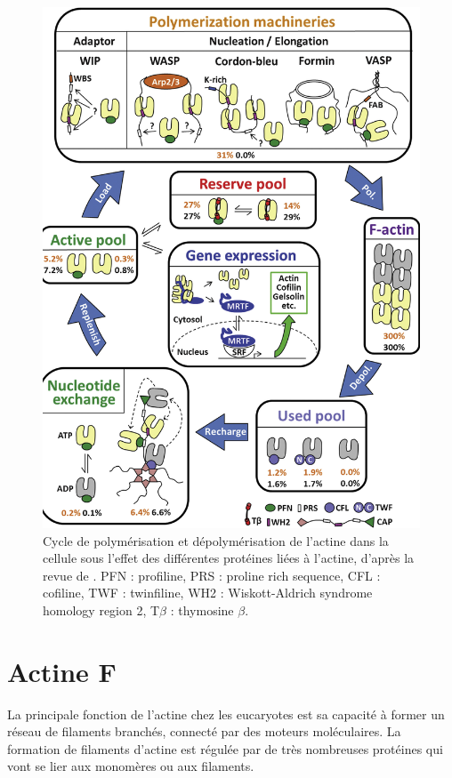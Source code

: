 \documentclass{report}
\begin{document}
\begin{figure}
\includegraphics[scale=0.25]{actine_cycle.png}
\caption{Cycle de polymérisation et dépolymérisation de l'actine dans la cellule sous l'effet des différentes protéines liées à l'actine, d'après la revue de \cite{xue_guardians_2013}. PFN : profiline, PRS : proline rich sequence, CFL : cofiline, TWF : twinfiline, WH2 : Wiskott-Aldrich syndrome homology region 2, T$\beta$ : thymosine $\beta$. } 
\end{figure}

\section{Actine F}

La principale fonction de l'actine chez les eucaryotes est sa capacité à former un réseau de filaments branchés, connecté par des moteurs moléculaires. 
La formation de filaments d'actine est régulée par de très nombreuses protéines qui vont se lier aux monomères ou aux filaments. 
\end{document}

